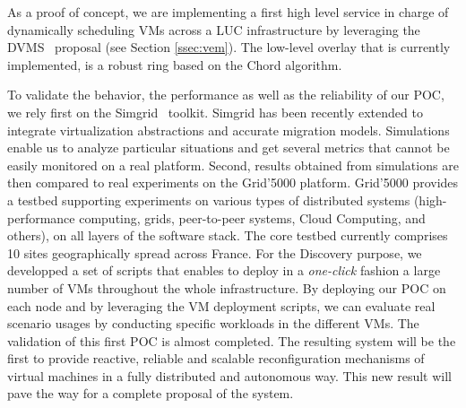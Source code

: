 As a proof of concept, we are implementing a first high level service in charge
of dynamically scheduling VMs across a LUC infrastructure by leveraging the
DVMS~\cite{quesnel:2012} proposal (see Section \ref{ssec:vem}). The low-level
overlay that is currently implemented, is a robust ring based on the  Chord  algorithm. 

%

To validate the behavior, the performance as well as the reliability of our
POC, we rely first on the Simgrid~\cite{Casanova:2008:SGF:1397760.1398183}
toolkit. Simgrid has been recently extended to integrate virtualization abstractions and accurate migration models. 
Simulations enable us to analyze particular situations and get several metrics
that cannot be easily monitored  on a real platform.
Second, results obtained from simulations are then compared to real experiments on the Grid'5000 platform. 
Grid'5000 provides a testbed supporting experiments on various types of
distributed systems (high-performance computing, grids, peer-to-peer systems,
Cloud Computing, and others), on all layers of the software stack. The core
testbed currently comprises 10 sites geographically spread across France. 
For the Discovery purpose, we developped a set of scripts that enables to deploy in a \emph{one-click} fashion a large number of VMs throughout 
the whole infrastructure\cite{flauncher}. By deploying our POC on each node and by
leveraging the VM deployment scripts, we can evaluate real scenario usages by conducting specific workloads in the different VMs. 
The validation of this first POC is almost completed. 
The resulting system will be the first to provide reactive,
reliable and scalable
reconfiguration mechanisms of virtual machines in a fully distributed and
autonomous way. This new result will pave the way for a complete proposal of
the \discovery system. 



